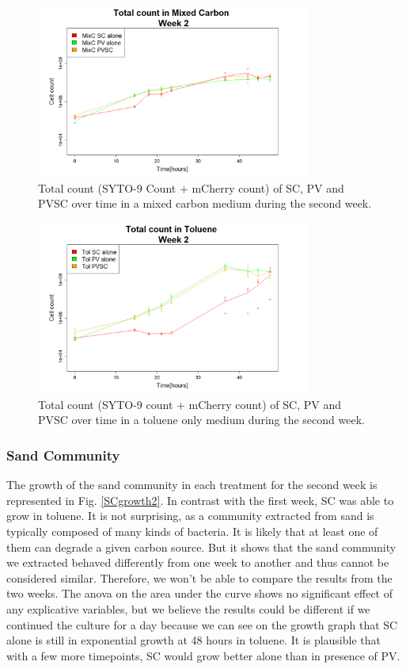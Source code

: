 \documentclass[a4paper, 10pt, conference]{ieeeconf}   %
\begin{document}
\begin{figure}[H]
	\centering
	\includegraphics[width=9cm]{totcount_mixC2.PNG}
	\caption{Total count (SYTO-9 Count + mCherry count) of SC, PV and PVSC over time in a mixed carbon medium during the second week.}
	\label{totcountmixC2text}
\end{figure}

\begin{figure}[H]
	\centering
	\includegraphics[width=9cm]{totcount_tol2.PNG}
	\caption{Total count (SYTO-9 count + mCherry count) of SC, PV and PVSC over time in a toluene only medium during the second week.}
	\label{totcounttol2text}
\end{figure}
\subsubsection{Sand Community}
The growth of the sand community in each treatment for the second week is represented in Fig. \ref{SCgrowth2}.
In contrast with the first week, SC was able to grow in toluene. It is not surprising, as a community extracted from sand is typically composed of many kinds of bacteria. It is likely that at least one of them can degrade a given carbon source. But it shows that the sand community we extracted behaved differently from one week to another and thus cannot be considered similar. Therefore, we won't be able to compare the results from the two weeks. 
The anova on the area under the curve shows no significant effect of any explicative variables, but we believe the results could be different if we continued the culture for a day because we can see on the growth graph that SC alone is still in exponential growth at 48 hours in toluene. It is plausible that with a few more timepoints, SC would grow better alone than in presence of PV.\newline
\end{document}
